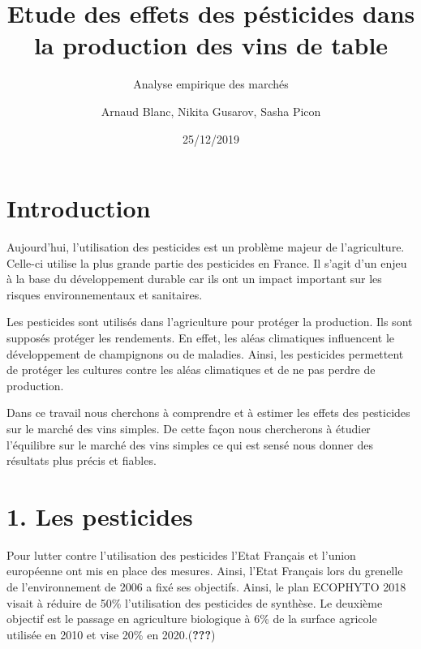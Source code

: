 \documentclass[11pt,]{article}
\title{Etude des effets des pésticides dans la production des vins de table}
\subtitle{Analyse empirique des marchés}
\author{Arnaud Blanc, Nikita Gusarov, Sasha Picon}
\date{25/12/2019}
\begin{document}
\maketitle


\hypersetup{linkcolor = black}

\tableofcontents





\newpage

\hypersetup{linkcolor = blue}

\hypertarget{introduction}{%
\section{Introduction}\label{introduction}}

Aujourd'hui, l'utilisation des pesticides est un problème majeur de
l'agriculture. Celle-ci utilise la plus grande partie des pesticides en
France. Il s'agit d'un enjeu à la base du développement durable car ils
ont un impact important sur les risques environnementaux et sanitaires.

Les pesticides sont utilisés dans l'agriculture pour protéger la
production. Ils sont supposés protéger les rendements. En effet, les
aléas climatiques influencent le développement de champignons ou de
maladies. Ainsi, les pesticides permettent de protéger les cultures
contre les aléas climatiques et de ne pas perdre de production.

Dans ce travail nous cherchons à comprendre et à estimer les effets des
pesticides sur le marché des vins simples. De cette façon nous
chercherons à étudier l'équilibre sur le marché des vins simples ce qui
est sensé nous donner des résultats plus précis et fiables.

\hypertarget{les-pesticides}{%
\section{1. Les pesticides}\label{les-pesticides}}

Pour lutter contre l'utilisation des pesticides l'Etat Français et
l'union européenne ont mis en place des mesures. Ainsi, l'Etat Français
lors du grenelle de l'environnement de 2006 a fixé ses objectifs. Ainsi,
le plan ECOPHYTO 2018 visait à réduire de 50\% l'utilisation des
pesticides de synthèse. Le deuxième objectif est le passage en
agriculture biologique à 6\% de la surface agricole utilisée en 2010 et
vise 20\% en 2020.({\textbf{???}})
\end{document}
